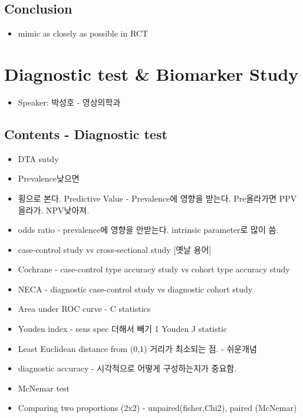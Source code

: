 \documentclass[]{book}
\providecommand{\tightlist}{%
  \setlength{\itemsep}{0pt}\setlength{\parskip}{0pt}}
\begin{document}
\subsection{Conclusion}\label{conclusion}

\begin{itemize}
\tightlist
\item
  mimic as closely as possible in RCT
\end{itemize}

\section{Diagnostic test \& Biomarker
Study}\label{diagnostic-test-biomarker-study}

\begin{itemize}
\tightlist
\item
  Speaker: 박성호 - 영상의학과
\end{itemize}

\subsection{Contents - Diagnostic
test}\label{contents---diagnostic-test}

\begin{itemize}
\tightlist
\item
  DTA sutdy
\item
  Prevalence낮으면
\item
  횡으로 본다. Predictive Value - Prevalence에 영향을 받는다.
  Pre올라가면 PPV올라가. NPV낮아져.
\item
  odds ratio - prevalence에 영향을 안받는다. intrinsic parameter로 많이
  씀.
\item
  case-control study vs cross-sectional study {[}옛날 용어{]}
\item
  Cochrane - case-control type accuracy study vs cohort type accuracy
  study
\item
  NECA - diagnostic case-control study vs diagnostic cohort study
\item
  Area under ROC curve - C statistics
\item
  Youden index - sens spec 더해서 빼기 1 Youden J statistic
\item
  Least Euclidean distance from (0,1) 거리가 최소되는 점. - 쉬운개념
\item
  diagnostic accuracy - 시각적으로 어떻게 구성하는지가 중요함.
\item
  McNemar test
\item
  Comparing two proportions (2x2) - unpaired(fisher,Chi2), paired
  (McNemar)
\end{itemize}
\end{document}
